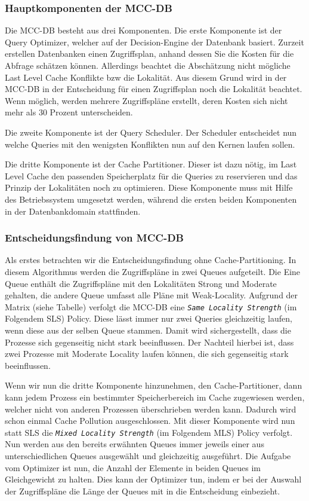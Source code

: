 \subsubsection*{Hauptkomponenten der MCC-DB}
Die MCC-DB besteht aus drei Komponenten. Die erste Komponente ist der Query Optimizer, welcher auf der Decision-Engine der Datenbank basiert. Zurzeit erstellen Datenbanken einen Zugriffsplan, anhand dessen Sie die Kosten für die Abfrage schätzen können. Allerdings beachtet die Abschätzung nicht mögliche Last Level Cache Konflikte bzw die Lokalität. Aus diesem Grund wird in der MCC-DB in der Entscheidung für einen Zugriffsplan noch die Lokalität beachtet. Wenn möglich, werden mehrere Zugriffspläne erstellt, deren Kosten sich nicht mehr als 30 Prozent unterscheiden.

Die zweite Komponente ist der Query Scheduler. Der Scheduler entscheidet nun welche Queries mit den wenigsten Konflikten nun auf den Kernen laufen sollen.

Die dritte Komponente ist der Cache Partitioner. Dieser ist dazu nötig, im Last Level Cache den passenden Speicherplatz für die Queries zu reservieren und das Prinzip der Lokalitäten noch zu optimieren. Diese Komponente muss mit Hilfe des Betriebssystem umgesetzt werden, während die ersten beiden Komponenten in der Datenbankdomain stattfinden.

\subsubsection*{Entscheidungsfindung von MCC-DB}
Als erstes betrachten wir die Entscheidungsfindung ohne Cache-Partitioning. In diesem Algorithmus werden die Zugriffspläne in zwei Queues aufgeteilt. Die Eine Queue enthält die Zugriffspläne mit den Lokalitäten Strong und Moderate gehalten, die andere Queue umfasst alle Pläne mit Weak-Locality. Aufgrund der Matrix (siehe Tabelle) verfolgt die MCC-DB eine \texttt{\textit{Same Locality Strength}} (im Folgendem SLS) Policy. Diese lässt immer nur zwei Queries gleichzeitig laufen, wenn diese aus der selben Queue stammen. Damit wird sichergestellt, dass die Prozesse sich gegenseitig nicht stark beeinflussen. Der Nachteil hierbei ist, dass zwei Prozesse mit Moderate Locality laufen können, die sich gegenseitig stark beeinflussen.

Wenn wir nun die dritte Komponente hinzunehmen, den Cache-Partitioner, dann kann jedem Prozess ein bestimmter Speicherbereich im Cache zugewiesen werden, welcher nicht von anderen Prozessen überschrieben werden kann. Dadurch wird schon einmal Cache Pollution ausgeschlossen. Mit dieser Komponente wird nun statt SLS die \texttt{\textit{Mixed Locality Strength}} (im Folgendem MLS) Policy verfolgt. Nun werden aus den bereits erwähnten Queues immer jeweils einer aus unterschiedlichen Queues ausgewählt und gleichzeitig ausgeführt. Die Aufgabe vom Optimizer ist nun, die Anzahl der Elemente in beiden Queues im Gleichgewicht zu halten. Dies kann der Optimizer tun, indem er bei der Auswahl der Zugriffspläne die Länge der Queues mit in die Entscheidung einbezieht.

